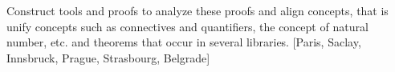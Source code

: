 Construct tools and proofs to analyze these proofs and align concepts,
that is unify concepts such as connectives and quantifiers, the
concept of natural number, etc. and theorems that occur in several
libraries.  [Paris, Saclay, Innsbruck, Prague, Strasbourg, Belgrade]
